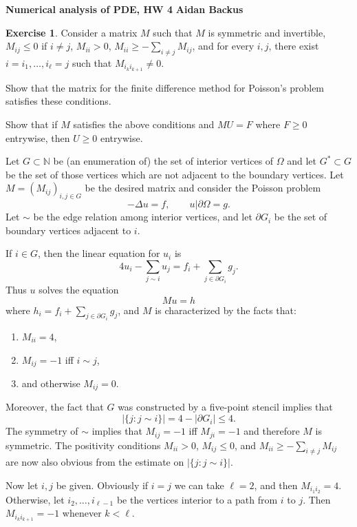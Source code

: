 \documentclass[10pt]{article}
\newcommand{\NN}{\mathbb{N}}
\theoremstyle{definition}
\newtheorem{exer}{Exercise}
\begin{document}
\noindent
\large\textbf{Numerical analysis of PDE, HW 4} \hfill \textbf{Aidan Backus} \\

\begin{exer}
Consider a matrix $M$ such that $M$ is symmetric and invertible, $M_{ij} \leq 0$ if $i \neq j$, $M_{ii} > 0$, $M_{ii} \geq -\sum_{i\neq j} M_{ij}$, and for every $i,j$, there exist $i = i_1, \dots, i_\ell = j$ such that $M_{i_k i_{k+1}} \neq 0$.

Show that the matrix for the finite difference method for Poisson's problem satisfies these conditions.

Show that if $M$ satisfies the above conditions and $MU = F$ where $F \geq 0$ entrywise, then $U \geq 0$ entrywise.
\end{exer}

Let $G \subset \NN$ be (an enumeration of) the set of interior vertices of $\Omega$ and let $G^* \subset G$ be the set of those vertices which are not adjacent to the boundary vertices.
Let $M = (M_{ij})_{i,j \in G}$ be the desired matrix and consider the Poisson problem
$$-\Delta u = f, \qquad u|\partial \Omega = g.$$
Let $\sim$ be the edge relation among interior vertices, and let $\partial G_i$ be the set of boundary vertices adjacent to $i$.

If $i \in G$, then the linear equation for $u_i$ is
$$4u_i - \sum_{j \sim i} u_j = f_i + \sum_{j \in \partial G_i} g_j.$$
Thus $u$ solves the equation
$$Mu = h$$
where $h_i = f_i + \sum_{j \in \partial G_i} g_j$, and $M$ is characterized by the facts that:
\begin{enumerate}
\item $M_{ii} = 4$,
\item $M_{ij} = -1$ iff $i \sim j$,
\item and otherwise $M_{ij} = 0$.
\end{enumerate}
Moreover, the fact that $G$ was constructed by a five-point stencil implies that
$$|\{j: j \sim i\}| = 4 - |\partial G_i| \leq 4.$$
The symmetry of $\sim$ implies that $M_{ij} = -1$ iff $M_{ji} = -1$ and therefore $M$ is symmetric. The positivity conditions $M_{ii} > 0$, $M_{ij} \leq 0$, and $M_{ii} \geq -\sum_{i \neq j} M_{ij}$ are now also obvious from the estimate on $|\{j: j \sim i\}|$.

Now let $i,j$ be given. Obviously if $i = j$ we can take $\ell = 2$, and then $M_{i_1i_2} = 4$.
Otherwise, let $i_2, \dots, i_{\ell - 1}$ be the vertices interior to a path from $i$ to $j$.
Then $M_{i_ki_{k + 1}} = -1$ whenever $k < \ell$.
\end{document}
